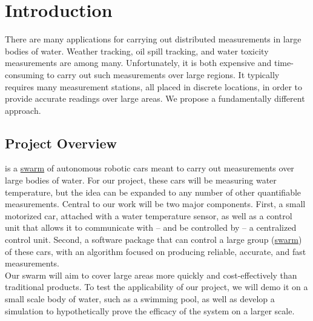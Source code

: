 \documentclass[11pt]{article}
\begin{document}
\newpage

\section{Introduction}

There are many applications for carrying out distributed measurements in large bodies of water. Weather tracking, oil spill tracking, and water toxicity measurements are among many. Unfortunately, it is both expensive and time-consuming to carry out such measurements over large regions. It typically requires many measurement stations, all placed in discrete locations, in order to provide accurate readings over large areas. We propose a fundamentally different approach.

\subsection{Project Overview}

\PROJECTNAME \space is a \hyperref[sec:definitions]{swarm} of autonomous robotic cars meant to carry out measurements over large bodies of water. For our project, these cars will be measuring water temperature, but the idea can be expanded to any number of other quantifiable measurements. Central to our work will be two major components. First, a small motorized car, attached with a water temperature sensor, as well as a control unit that allows it to communicate with – and be controlled by – a centralized control unit. Second, a software package that can control a large group (\hyperref[sec:definitions]{swarm}) of these cars, with an algorithm focused on producing reliable, accurate, and fast measurements.\\

Our swarm will aim to cover large areas more quickly and cost-effectively than traditional products. To test the applicability of our project, we will demo it on a small scale body of water, such as a swimming pool, as well as develop a simulation to hypothetically prove the efficacy of the system on a larger scale.\\
\end{document}
